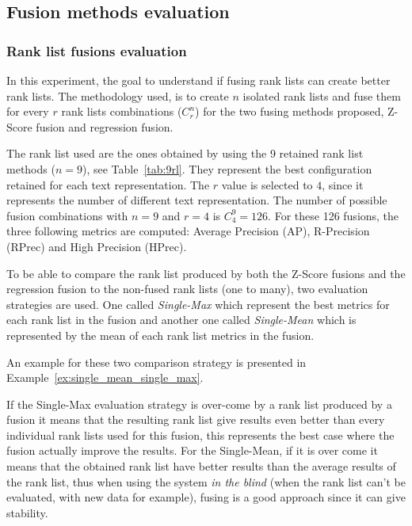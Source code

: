 \subsection{Fusion methods evaluation}

\subsubsection{Rank list fusions evaluation \label{sec:eval_fusion}}

In this experiment, the goal to understand if fusing rank lists can create better rank lists.
The methodology used, is to create $n$ isolated rank lists and fuse them for every $r$ rank lists combinations ($C^n_r$) for the two fusing methods proposed, Z-Score fusion and regression fusion.

The rank list used are the ones obtained by using the 9 retained rank list methods ($n=9$), see Table~\ref{tab:9rl}.
They represent the best configuration retained for each text representation.
The $r$ value is selected to $4$, since it represents the number of different text representation.
The number of possible fusion combinations with $n=9$ and $r=4$ is $C^{9}_{4} = 126$.
For these 126 fusions, the three following metrics are computed: Average Precision (AP), R-Precision (RPrec) and High Precision (HPrec).

To be able to compare the rank list produced by both the Z-Score fusions and the regression fusion to the non-fused rank lists (one to many), two evaluation strategies are used.
One called \textit{Single-Max} which represent the best metrics for each rank list in the fusion and another one called \textit{Single-Mean} which is represented by the mean of each rank list metrics in the fusion.

An example for these two comparison strategy is presented in Example~\ref{ex:single_mean_single_max}.

If the Single-Max evaluation strategy is over-come by a rank list produced by a fusion it means that the resulting rank list give results even better than every individual rank lists used for this fusion, this represents the best case where the fusion actually improve the results.
For the Single-Mean, if it is over come it means that the obtained rank list have better results than the average results of the rank list, thus when using the system \textit{in the blind} (when the rank list can't be evaluated, with new data for example), fusing is a good approach since it can give stability.

